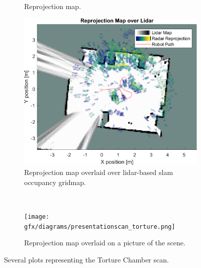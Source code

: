 \begin{figure}[htbp]
\begin{subfigure}[t]{.45\textwidth}
        \caption{Reprojection map.}
        \label{fig:pres3-r}
    \end{subfigure}%
    \hfill%
    \begin{subfigure}[t]{.45\textwidth}
        \includegraphics[max width=\linewidth]{gfx/results/torturechamber_map.png}
        \caption{Reprojection map overlaid over lidar-based slam occupancy gridmap.}
        \label{fig:pres3-l}
    \end{subfigure}\medskip\\
    \begin{subfigure}{\textwidth}
        \texttt{[image: gfx/diagrams/presentationscan\_torture.png]}
        \caption{Reprojection map overlaid on a picture of the scene.}
        \label{fig:pres3-3d}
    \end{subfigure}
    \caption{Several plots representing the Torture Chamber scan.}
    \label{fig:pres3}
\end{figure}

